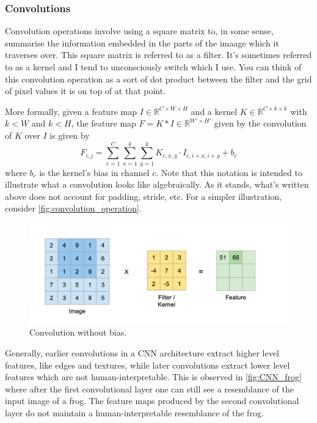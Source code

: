 \documentclass[11pt]{article}
\begin{document}
\subsubsection{Convolutions}
Convolution operations involve using a square matrix to, in some sense, summarise the information embedded in the parts of the imaage which it traverses over. This square matrix is referred to as a filter. It's sometimes referred to as a kernel and I tend to unconsciously switch which I use. You can think of this convolution operation as a sort of dot product between the filter and the grid of pixel values it is on top of at that point.

More formally, given a feature map $I\in\mathbb{R}^{C\times W\times H}$ and a kernel $K\in\mathbb{R}^{C\times k\times k}$ with $k<W$ and $k<H$, the feature map $F=K*I\in\mathbb{R}^{W'\times H'}$ given by the convolution of $K$ over $I$ is given by
$$
F_{i,j}
=
\sum_{c=1}^C\sum_{x=1}^{k}\sum_{y=1}^{k}K_{c,x,y}\cdot I_{c,i+x,i+y}+b_c
$$
where $b_c$ is the kernel's bias in channel $c$. Note that this notation is intended to illustrate what a convolution looks like algebraically. As it stands, what's written above does not account for padding, stride, etc. For a simpler illustration, consider \autoref{fig:convolution_operation}.

\begin{figure}[ht]
    \centering
    \includegraphics[width=1\textwidth]{./figures/neural_nets/CNN_convolution.png}
    \caption{Convolution without bias.}
    \label{fig:convolution_operation}
\end{figure}

Generally, earlier convolutions in a CNN architecture extract higher level features, like edges and textures, while later convolutions extract lower level features which are not human-interpretable. This is observed in \autoref{fig:CNN_frog} where after the first convolutional layer one can still see a resemblance of the input image of a frog. The feature maps produced by the second convolutional layer do not maintain a human-interpretable resemblance of the frog.
\end{document}
